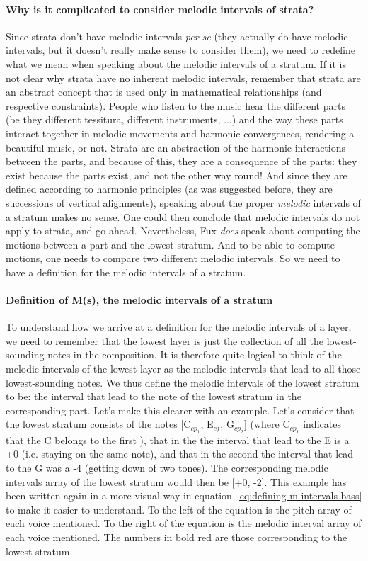 \paragraph{Why is it complicated to consider melodic intervals of strata?}
Since strata don't have melodic intervals \textit{per se} (they actually do have melodic intervals, but it doesn't really make sense to consider them), we need to redefine what we mean when speaking about the melodic intervals of a stratum. If it is not clear why strata have no inherent melodic intervals, remember that strata are an abstract concept that is used only in mathematical relationships (and respective constraints). People who listen to the music hear the different parts (be they different tessitura, different instruments, ...) and the way these parts interact together in melodic movements and harmonic convergences, rendering a beautiful music, or not. Strata are an abstraction of the harmonic interactions between the parts, and because of this, they are a consequence of the parts: they exist because the parts exist, and not the other way round! And since they are defined according to harmonic principles (as was suggested before, they are successions of vertical alignments), speaking about the proper \textit{melodic} intervals of a stratum makes no sense. One could then conclude that melodic intervals do not apply to strata, and go ahead. Nevertheless, Fux \textit{does} speak about computing the motions between a part and the lowest stratum. And to be able to compute motions, one needs to compare two different melodic intervals. So we need to have a definition for the melodic intervals of a stratum. 

\paragraph{Definition of M(s), the melodic intervals of a stratum}
To understand how we arrive at a definition for the melodic intervals of a layer, we need to remember that the lowest layer is just the collection of all the lowest-sounding notes in the composition. It is therefore quite logical to think of the melodic intervals of the lowest layer as the melodic intervals that lead to all those lowest-sounding notes. We thus define the melodic intervals of the lowest stratum to be: the interval that lead to the note of the lowest stratum in the corresponding part. Let's make this clearer with an example. Let's consider that the lowest stratum consists of the notes [C$_{cp_1}$, E$_{\mathit{cf}}$, G$_{cp_2}$] (where C$_{cp_1}$ indicates that the C belongs to the first \cp), that in the \cfs the interval that lead to the E is a +0 (i.e. staying on the same note), and that in the second \cps the interval that lead to the G was a -4 (getting down of two tones). The corresponding melodic intervals array of the lowest stratum would then be [+0, -2]. This example has been written again in a more visual way in equation~\ref{eq:defining-m-intervals-bass} to make it easier to understand. To the left of the equation is the pitch array of each voice mentioned. To the right of the equation is the melodic interval array of each voice mentioned. The numbers in bold red are those corresponding to the lowest stratum.


